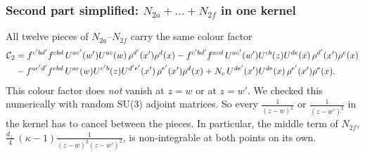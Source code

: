 \documentclass[9pt]{article}
\numberwithin{equation}{section}
\begin{document}
\subsubsection*{{\color{red}Second part simplified: $N_{2a}+\dots+N_{2f}$ in one kernel}}
{\color{red}All twelve pieces of $N_{2a}$--$N_{2f}$ carry the same colour factor
\begin{align}
\mathcal C_{2}&=f^{c'bd'}f^{cbd}\,U^{ac'}(w')U^{ac}(w)\,\rho^{d'}(x')\rho^{d}(x)-f^{c'bd'}f^{acd}\,U^{ac'}(w')U^{cb}(z)U^{de}(x)\,\rho^{d'}(x')\rho^{e}(x)\notag\\
&-f^{ac'd'}f^{cbd}\,U^{ac}(w)U^{c'b}(z)U^{d'e'}(x')\,\rho^{e'}(x')\rho^{d}(x)+N_{c}\,U^{de'}(x')U^{de}(x)\,\rho^{e'}(x')\rho^{e}(x).
\end{align}
This colour factor does \emph{not} vanish at $z=w$ or at $z=w'$. We checked this numerically with random SU(3) adjoint matrices. So every $\frac{1}{(z-w)^{2}}$ or $\frac{1}{(z-w')^{2}}$ in the kernel has to cancel between the pieces. In particular, the middle term of $N_{2f}$, $\frac{d_{\perp}}{4}\,(\kappa-1)\frac{1}{(z-w)^{2}(z-w')^{2}}$, is non-integrable at both points on its own.

}
\end{document}

